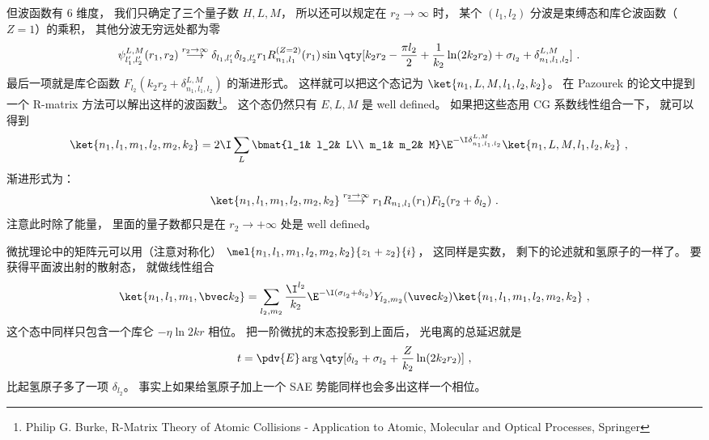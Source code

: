 但波函数有 6 维度， 我们只确定了三个量子数 $H,L,M$， 所以还可以规定在 $r_2\to\infty$ 时， 某个 $(l_1,l_2)$ 分波是束缚态和库仑波函数（$Z=1$）的乘积， 其他分波无穷远处都为零
\begin{equation}
\begin{aligned}
&\psi_{l'_1,l'_2}^{L, M}(r_1, r_2) \overset{r_2\to\infty}{\longrightarrow} \delta_{l_1,l'_1}\delta_{l_2,l'_2} r_1 R_{n_1,l_1}^{(Z=2)}(r_1)
\sin\qty[k_2 r_2 - \frac{\pi l_2}{2} +\frac{1}{k_2}\ln(2k_2 r_2) + \sigma_{l_2} + \delta_{n_1,l_1,l_2}^{L,M}]~.
\end{aligned}
\end{equation}
最后一项就是库仑函数 $F_{l_2}(k_2 r_2 + \delta_{n_1,l_1,l_2}^{L,M})$ 的渐进形式。 这样就可以把这个态记为 $\ket{n_1,L,M,l_1,l_2,k_2}$。 在 Pazourek 的论文中提到一个 R-matrix 方法可以解出这样的波函数\footnote{Philip G. Burke, R-Matrix Theory of Atomic Collisions - Application to Atomic, Molecular and Optical Processes, Springer}。 这个态仍然只有 $E,L,M$ 是 well defined。 如果把这些态用 CG 系数线性组合一下， 就可以得到
\begin{equation}
\begin{aligned}
&\ket{n_1,l_1,m_1,l_2,m_2,k_2}
= 2\I \sum_{L} \bmat{l_1& l_2& L\\ m_1& m_2& M} \E^{-\I \delta_{n_1,l_1,l_2}^{L,M}} \ket{n_1,L,M,l_1,l_2,k_2}~,
\end{aligned}
\end{equation}
渐进形式为：
\begin{equation}
\ket{n_1,l_1,m_1, l_2,m_2,k_2} \overset{r_2\to\infty}{\longrightarrow} r_1 R_{n_1,l_1}(r_1) F_{l_2}(r_2 + \delta_{l_2})~.
\end{equation}
注意此时除了能量， 里面的量子数都只是在 $r_2\to+\infty$ 处是 well defined。

微扰理论中的矩阵元可以用（注意对称化） $\mel{n_1,l_1,m_1, l_2,m_2,k_2}{z_1 + z_2}{i}$， 这同样是实数， 剩下的论述就和氢原子的一样了。 要获得平面波出射的散射态， 就做线性组合
\begin{equation}
\ket{n_1, l_1, m_1, \bvec k_2} = \sum_{l_2,m_2}\frac{\I^{l_2}}{k_2} \E^{-\I(\sigma_{l_2}+\delta_{l_2})} Y_{l_2,m_2} (\uvec k_2) \ket{n_1,l_1,m_1, l_2,m_2,k_2}~,
\end{equation}
这个态中同样只包含一个库仑 $-\eta\ln 2kr$ 相位。 把一阶微扰的末态投影到上面后， 光电离的总延迟就是
\begin{equation}
t = \pdv{E} \arg\qty[\delta_{l_2} + \sigma_{l_2} + \frac{Z}{k_2}\ln(2k_2 r_2)]~, %
\end{equation}
比起氢原子多了一项 $\delta_{l_2}$。 事实上如果给氢原子加上一个 SAE 势能同样也会多出这样一个相位。

